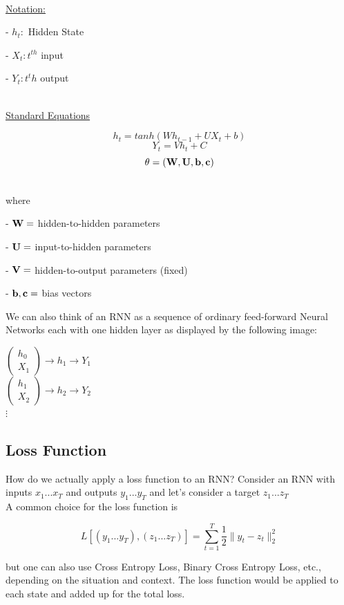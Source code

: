 ~\\\underline{Notation:}

- $h_t:$ Hidden State

- $X_t: t^{th}$ input 

- $Y_t: t^th$ output

~\\\underline{Standard Equations}

$$h_t = tanh(Wh_{t-1} + UX_{t} + b)$$
$$Y_t = Vh_t + C$$
$$\theta = (\MW, \MU, \vb,\vc)$$

~\\ where

- $\MW=$ hidden-to-hidden parameters

- $\MU=$ input-to-hidden parameters

- $ \MV=$ hidden-to-output parameters (fixed)

- $\vb,\vc =$ bias vectors

\noindent We can also think of an RNN as a sequence of ordinary feed-forward Neural Networks each with one hidden layer as displayed by the following image:

\begin{center}
$\begin{pmatrix}
 h_0\\
 X_1
\end{pmatrix} \longrightarrow	h_1 \longrightarrow	Y_1$\\
$\begin{pmatrix}
 h_1\\
 X_2
\end{pmatrix} \longrightarrow	h_2 \longrightarrow	Y_2$\\
  $\vdots$
\end{center}
\subsection{Loss Function}
How do we actually apply a loss function to an RNN? Consider an RNN with inputs $x_{1}...x_{T}$ and outputs $y_{1}...y_{T}$ and let's consider a target $z_{1}...z_{T}$ \\

A common choice for the loss function is 

$$ L \left[ \left( y_{1}...y_{T} \right), \left( z_{1}...z_{T} \right) \right] = \sum_{t=1}^{T} \frac{1}{2} \lVert y_{t} - z_{t} \rVert_{2}^2 $$

but one can also use Cross Entropy Loss, Binary Cross Entropy Loss, etc., depending on the situation and context. The loss function would be applied to each state and added up for the total loss.

